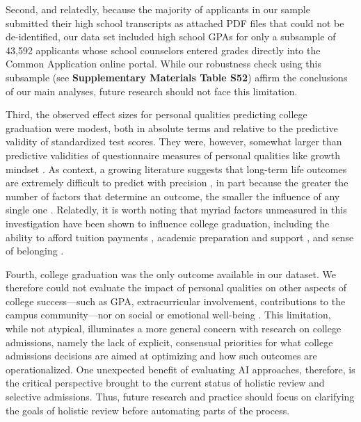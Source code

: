 \documentclass[11pt]{report}
\begin{document}
\begin{mainf}
Second, and relatedly, because the majority of applicants in our sample submitted their high school transcripts as attached PDF files that could not be de-identified, our data set included high school GPAs for only a subsample of 43,592 applicants whose school counselors entered grades directly into the Common Application online portal. While our robustness check using this subsample (see \textbf{Supplementary Materials Table S52}) affirm the conclusions of our main analyses, future research should not face this limitation. 

Third, the observed effect sizes for personal qualities predicting college graduation were modest, both in absolute terms and relative to the predictive validity of standardized test scores. They were, however, somewhat larger than predictive validities of questionnaire measures of personal qualities like growth mindset \cite{goyer_role_2021}. As context, a growing literature suggests that long-term life outcomes are extremely difficult to predict with precision \cite{salganik_measuring_2020,martin_exploring_2016}, in part because the greater the number of factors that determine an outcome, the smaller the influence of any single one \cite{ahadi_multiple_1989, gotz_small_2022}. 
Relatedly, it is worth noting that myriad factors unmeasured in this investigation have been shown to influence college graduation, including the ability to afford tuition payments \cite{goldrick-rab_following_2006}, academic preparation and support \cite{hepworth_factors_2018,porchea_predictors_2010}, and sense of belonging \cite{murphy_customized_2020, goyer_role_2021}. 

Fourth, college graduation was the only outcome available in our dataset. We therefore could not evaluate the impact of personal qualities on other aspects of college success---such as GPA, extracurricular involvement, contributions to the campus community---nor on social or emotional well-being \cite{willingham_success_1985}. This limitation, while not atypical, illuminates a more general concern with research on college admissions, namely the lack of explicit, consensual priorities for what college admissions decisions are aimed at optimizing and how such outcomes are operationalized. 
One unexpected benefit of evaluating AI approaches, therefore, is the critical perspective brought to the current status of holistic review and selective admissions. Thus, future research and practice should focus on clarifying the goals of holistic review \cite{bastedo_what_2018} before automating parts of the process. 


\end{mainf}
\end{document}
